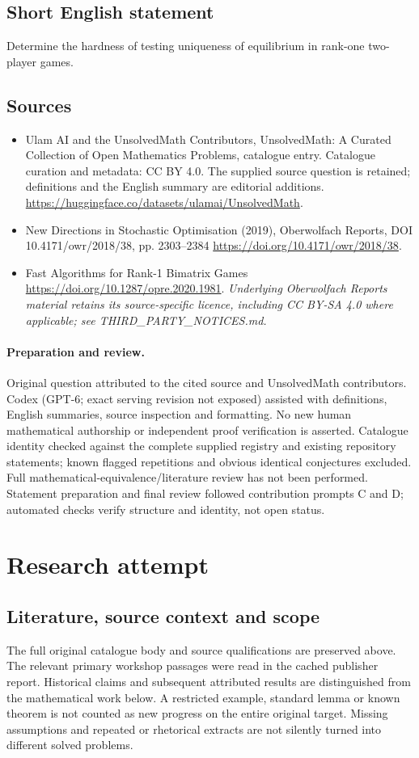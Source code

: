 \documentclass[11pt]{article}
\begin{document}
\subsection{Short English statement}
Determine the hardness of testing uniqueness of equilibrium in rank-one two-player games.
\subsection{Sources}
\begin{itemize}
\item[S1] Ulam AI and the UnsolvedMath Contributors, UnsolvedMath: A Curated Collection of Open Mathematics Problems, catalogue entry. Catalogue curation and metadata: CC BY 4.0. The supplied source question is retained; definitions and the English summary are editorial additions.
\url{https://huggingface.co/datasets/ulamai/UnsolvedMath}.
\item[S2] New Directions in Stochastic Optimisation (2019), Oberwolfach Reports, DOI 10.4171/owr/2018/38, pp. 2303--2384
\url{https://doi.org/10.4171/owr/2018/38}.
\item[S3] Fast Algorithms for Rank-1 Bimatrix Games
\url{https://doi.org/10.1287/opre.2020.1981}.
\textit{Underlying Oberwolfach Reports material retains its source-specific licence, including CC BY-SA 4.0 where applicable; see THIRD\_PARTY\_NOTICES.md.}
\end{itemize}
\paragraph{Preparation and review.}
Original question attributed to the cited source and UnsolvedMath contributors. Codex (GPT-6; exact serving revision not exposed) assisted with definitions, English summaries, source inspection and formatting. No new human mathematical authorship or independent proof verification is asserted. Catalogue identity checked against the complete supplied registry and existing repository statements; known flagged repetitions and obvious identical conjectures excluded. Full mathematical-equivalence/literature review has not been performed. Statement preparation and final review followed contribution prompts C and D; automated checks verify structure and identity, not open status.
\label{end:statement}

\section{Research attempt}
\subsection{Literature, source context and scope}
The full original catalogue body and source qualifications are preserved above. The relevant primary workshop passages were read in the cached publisher report. Historical claims and subsequent attributed results are distinguished from the mathematical work below. A restricted example, standard lemma or known theorem is not counted as new progress on the entire original target. Missing assumptions and repeated or rhetorical extracts are not silently turned into different solved problems.
\end{document}
